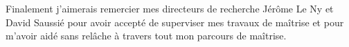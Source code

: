 
Finalement j'aimerais remercier mes directeurs de recherche Jérôme Le Ny et David Saussié pour avoir accepté de superviser mes travaux de maîtrise et pour m'avoir aidé sans relâche à travers tout mon parcours de maîtrise.
